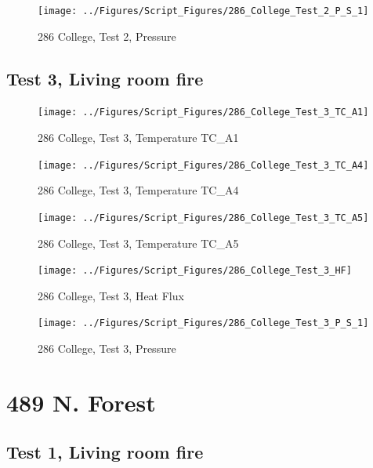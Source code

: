 \documentclass[12pt,oneside]{book}
\begin{document}
\begin{figure}[!ht]
\texttt{[image: ../Figures/Script\_Figures/286\_College\_Test\_2\_P\_S\_1]}
\caption{286 College, Test 2, Pressure}
\label{fig:286_College_Test_2_P_S_1}
\end{figure}


\clearpage


\subsection{Test 3, Living room fire}

\begin{figure}[!ht]
\texttt{[image: ../Figures/Script\_Figures/286\_College\_Test\_3\_TC\_A1]}
\caption{286 College, Test 3, Temperature TC\_A1}
\label{fig:286_College_Test_3_TC_A1}
\end{figure}

\begin{figure}[!ht]
\texttt{[image: ../Figures/Script\_Figures/286\_College\_Test\_3\_TC\_A4]}
\caption{286 College, Test 3, Temperature TC\_A4}
\label{fig:286_College_Test_3_TC_A4}
\end{figure}

\begin{figure}[!ht]
\texttt{[image: ../Figures/Script\_Figures/286\_College\_Test\_3\_TC\_A5]}
\caption{286 College, Test 3, Temperature TC\_A5}
\label{fig:286_College_Test_3_TC_A5}
\end{figure}

\begin{figure}[!ht]
\texttt{[image: ../Figures/Script\_Figures/286\_College\_Test\_3\_HF]}
\caption{286 College, Test 3, Heat Flux}
\label{fig:286_College_Test_3_HF}
\end{figure}

\begin{figure}[!ht]
\texttt{[image: ../Figures/Script\_Figures/286\_College\_Test\_3\_P\_S\_1]}
\caption{286 College, Test 3, Pressure}
\label{fig:286_College_Test_3_P_S_1}
\end{figure}


\clearpage


\section{489 N. Forest}

\subsection{Test 1, Living room fire}
\end{document}

